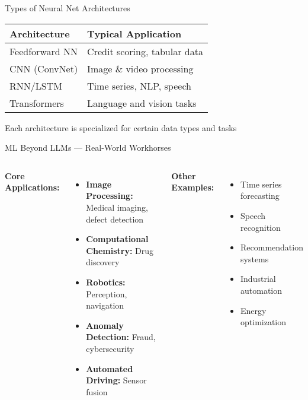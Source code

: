 \documentclass[aspectratio=169]{beamer}
\begin{document}
\begin{frame}{Types of Neural Net Architectures}
  \begin{table}
    \centering
    \begin{tabular}{ll}
      \toprule
      \textbf{Architecture} & \textbf{Typical Application} \\
      \midrule
      Feedforward NN & Credit scoring, tabular data \\
      CNN (ConvNet) & Image \& video processing \\
      RNN/LSTM & Time series, NLP, speech \\
      Transformers & Language and vision tasks \\
      \bottomrule
    \end{tabular}
  \end{table}

  \vspace{0.5cm}
  Each architecture is specialized for certain data types and tasks
\end{frame}

\begin{frame}{ML Beyond LLMs — Real-World Workhorses}
  \begin{columns}
    \textbf{Core Applications:}
    \begin{itemize}
      \item \textbf{Image Processing:} Medical imaging, defect detection
      \item \textbf{Computational Chemistry:} Drug discovery
      \item \textbf{Robotics:} Perception, navigation
      \item \textbf{Anomaly Detection:} Fraud, cybersecurity
      \item \textbf{Automated Driving:} Sensor fusion
    \end{itemize}

    \textbf{Other Examples:}
    \begin{itemize}
      \item Time series forecasting
      \item Speech recognition
      \item Recommendation systems
      \item Industrial automation
      \item Energy optimization
    \end{itemize}
  \end{columns}
\end{frame}
\end{document}
